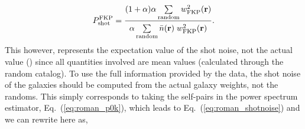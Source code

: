                                                                                                                                                                                                                                                                         \begin{equation} \label{eq:fkp_shotnoise}
                                                                                                                                                                                                                                                                        P^\mathrm{FKP}_\mathrm{shot} = \frac{(1+\alpha) \alpha \sum\limits_{\mathrm{random}} w_\mathrm{FKP}^2({\bf r})}{\alpha \sum\limits_{\mathrm{random}}^{ } \bar{n}({\bf r})\; w_\mathrm{FKP}^2({\bf r})}.
                                                                                                                                                                                                                                                                        \end{equation} 
                                                                                                                                                                                                                                                                        This however, represents the expectation value of the shot noise, not the actual value 
                                                                                                                                                                                                                                                                        (\citealt{Hamilton:1997aa}) since all quantities involved are mean values (calculated through the random catalog). To use the full information provided by the data, the shot noise of the galaxies should be computed from the actual galaxy weights, not the randoms. This simply corresponds to taking the self-pairs in the power spectrum estimator, Eq.~(\ref{eq:roman_p0k}), which leads to Eq.~(\ref{eq:roman_shotnoise}) and we can rewrite here as,

